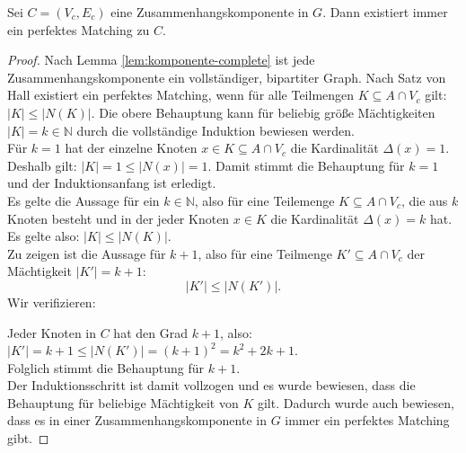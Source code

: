 \begin{lemma}\label{lem:komponente-matching}
Sei $C = (V_c, E_c)$ eine
Zusammenhangskomponente in $G$. Dann existiert immer ein perfektes Matching zu $C$.
\end{lemma}
\begin{proof} 
Nach Lemma \ref{lem:komponente-complete} ist jede Zusammenhangskomponente ein vollständiger,
bipartiter Graph. Nach Satz von Hall existiert ein perfektes Matching, wenn
für alle Teilmengen $K \subseteq A \cap V_c$ gilt: $|K| \leqslant |N(K)|$.
Die obere Behauptung kann für beliebig größe Mächtigkeiten $|K| = k \in \mathbb{N}$
durch die vollständige Induktion bewiesen werden.\\

\noindent
{} Für $k = 1$ hat der einzelne Knoten $x \in K \subseteq A \cap V_c$
die Kardinalität $\Delta(x) = 1$.
Deshalb gilt: $|K| = 1 \leqslant |N(x)| = 1$. Damit stimmt die Behauptung für $k = 1$ und der Induktionsanfang ist erledigt.\\

\noindent
{} Es gelte die Aussage für ein $k \in \mathbb{N}$, also für eine Teilemenge
$K \subseteq A \cap V_c$, die aus $k$ Knoten besteht und in der jeder Knoten $x \in K$ die Kardinalität
$\Delta(x) = k$ hat.\\ Es gelte also: $|K| \leqslant |N(K)|$.\\
Zu zeigen ist die Aussage für $k + 1$, also für eine Teilmenge $K' \subseteq A \cap V_c$ der Mächtigkeit 
$|K'| = k+1$:
\[
|K'| \leqslant |N(K')|.
\] 
Wir verifizieren:

Jeder Knoten in $C$ hat den Grad $k+1$, also: $|K'| = k + 1 \leqslant |N(K')| = (k+1)^2 = k^2 + 2k + 1$.\\
Folglich stimmt die Behauptung für $k+1$.\\

Der Induktionsschritt ist damit vollzogen und es wurde bewiesen, dass die Behauptung für beliebige
Mächtigkeit von $K$ gilt.
Dadurch wurde auch bewiesen, dass es in einer Zusammenhangskomponente in $G$
 immer ein perfektes Matching gibt.
\end{proof}
